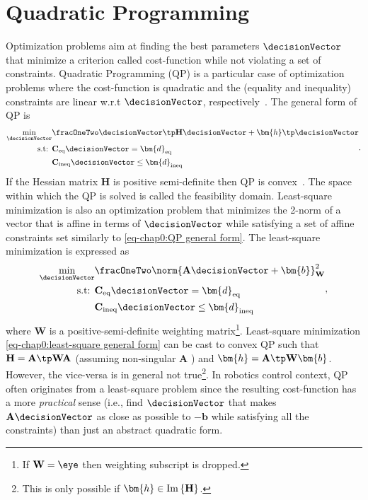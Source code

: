 \section{Quadratic Programming}
Optimization problems aim at finding the best parameters $\decisionVector$ that minimize a criterion called cost-function while not violating a set of constraints. Quadratic Programming (QP) is a particular case of optimization problems where the cost-function is quadratic and the (equality and inequality) constraints are linear w.r.t $\decisionVector$, respectively~\cite{betts2010bookOptimalControl}. The general form of QP is 
\begin{align}\label{eq-chap0:QP general form}
	\begin{split}
		\underset{\decisionVector}{\min}& \fracOneTwo \decisionVector\tp\mathbf{H}\decisionVector + \bm{h}\tp\decisionVector\\
		\text{s.t: }& \mathbf{C}_{\rm eq} \decisionVector = \bm{d}_{\rm eq}\\
					& \mathbf{C}_{\rm ineq} \decisionVector \leq \bm{d}_{\rm ineq}
	\end{split}.
\end{align}
If the Hessian matrix $\mathbf{H}$ is  positive semi-definite then QP is convex~\cite{nocedal2006springerBookOPtimization}. The space within which the QP is solved is called the feasibility domain. Least-square minimization is also an optimization problem that minimizes the 2-norm of a vector that is affine in terms of $\decisionVector$ while satisfying a set of affine constraints set similarly to \cref{eq-chap0:QP general form}. The least-square minimization is expressed as  
\begin{align}\label{eq-chap0:least-square general form}
	\begin{split}
		\underset{\decisionVector}{\min}& \fracOneTwo \norm{\mathbf{A}\decisionVector+\bm{b}}_\mathbf{W}^2\\
		\text{s.t: }& \mathbf{C}_{\rm eq} \decisionVector = \bm{d}_{\rm eq}\\
		& \mathbf{C}_{\rm ineq} \decisionVector \leq \bm{d}_{\rm ineq}
	\end{split},
\end{align}
where $\mathbf{W}$ is a positive-semi-definite weighting matrix\footnote{If $\mathbf{W} = \eye$ then weighting subscript is dropped.}. Least-square minimization \cref{eq-chap0:least-square general form} can be cast to convex QP such that
$\mathbf{H} = \mathbf{A}\tp\mathbf{W}\mathbf{A}$ (assuming non-singular $\mathbf{A}$ \cite{ayres1962schaum}) and $\bm{h} = \mathbf{A}\tp\mathbf{W}\bm{b}$. However, the vice-versa is in general not true\footnote{This is only possible if $\bm{h}\in{\rm Im}\left\{\mathbf{H}\right\}$.}. In robotics control context, QP often  originates from a least-square problem since the resulting cost-function has a more \emph{practical} sense (i.e., find $\decisionVector$ that makes $\mathbf{A}\decisionVector$ as close as possible to $-\bm{b}$ while satisfying all the constraints) than just an abstract quadratic form.   

